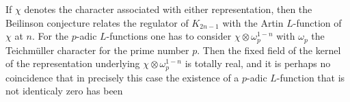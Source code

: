 \documentclass{amsart}
\begin{document}
If $ \chi $ denotes the character associated with either representation, then
the Beilinson conjecture relates the regulator of $ K_{2n-1} $ with the Artin {$L$-function{\futurelet{}}} of $ \chi $
at $ n $.
For the {$p$-adic{\futurelet{}}} {$L$-functions{\futurelet{}}} one has to consider $ \chi {\otimes} \omega_p^{1-n} $ with $ \omega_p $ the Teichm\"uller
character for the prime number $ p $.  Then the fixed field of
the kernel of the representation underlying
$ \chi {\otimes} \omega_p^{1-n} $ is totally real,
and it is perhaps no coincidence that in precisely this
case the existence of a  {$p$-adic{\futurelet{}}} {$L$-function{\futurelet{}}} that is not identicaly zero has been
\end{document}
